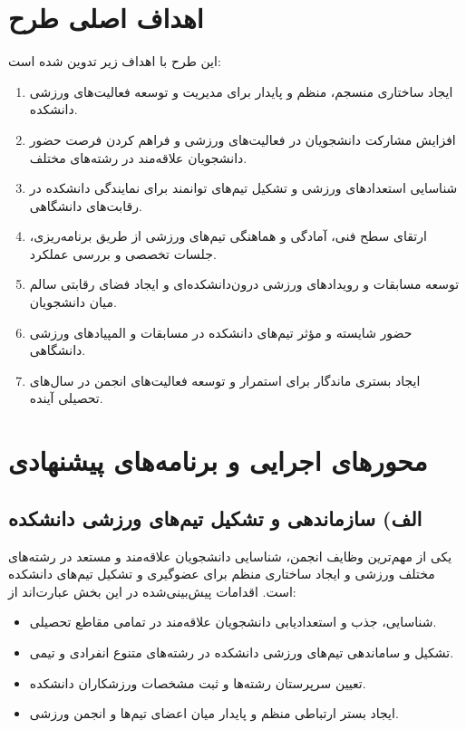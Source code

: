 \documentclass[12pt,a4paper]{article}
\begin{document}
\section{اهداف اصلی طرح}
این طرح با اهداف زیر تدوین شده است:
\begin{enumerate}
    \item ایجاد ساختاری منسجم، منظم و پایدار برای مدیریت و توسعه فعالیت‌های ورزشی دانشکده.
    \item افزایش مشارکت دانشجویان در فعالیت‌های ورزشی و فراهم کردن فرصت حضور دانشجویان علاقه‌مند در رشته‌های مختلف.
    \item شناسایی استعدادهای ورزشی و تشکیل تیم‌های توانمند برای نمایندگی دانشکده در رقابت‌های دانشگاهی.
    \item ارتقای سطح فنی، آمادگی و هماهنگی تیم‌های ورزشی از طریق برنامه‌ریزی، جلسات تخصصی و بررسی عملکرد.
    \item توسعه مسابقات و رویدادهای ورزشی درون‌دانشکده‌ای و ایجاد فضای رقابتی سالم میان دانشجویان.
    \item حضور شایسته و مؤثر تیم‌های دانشکده در مسابقات و المپیادهای ورزشی دانشگاهی.
    \item ایجاد بستری ماندگار برای استمرار و توسعه فعالیت‌های انجمن در سال‌های تحصیلی آینده.
\end{enumerate}

\section{محورهای اجرایی و برنامه‌های پیشنهادی}

\subsection*{الف) سازماندهی و تشکیل تیم‌های ورزشی دانشکده}
یکی از مهم‌ترین وظایف انجمن، شناسایی دانشجویان علاقه‌مند و مستعد در رشته‌های مختلف ورزشی و ایجاد ساختاری منظم برای عضوگیری و تشکیل تیم‌های دانشکده است. اقدامات پیش‌بینی‌شده در این بخش عبارت‌اند از:
\begin{itemize}
    \item شناسایی، جذب و استعدادیابی دانشجویان علاقه‌مند در تمامی مقاطع تحصیلی.
    \item تشکیل و ساماندهی تیم‌های ورزشی دانشکده در رشته‌های متنوع انفرادی و تیمی.
    \item تعیین سرپرستان رشته‌ها و ثبت مشخصات ورزشکاران دانشکده.
    \item ایجاد بستر ارتباطی منظم و پایدار میان اعضای تیم‌ها و انجمن ورزشی.
\end{itemize}
\end{document}
